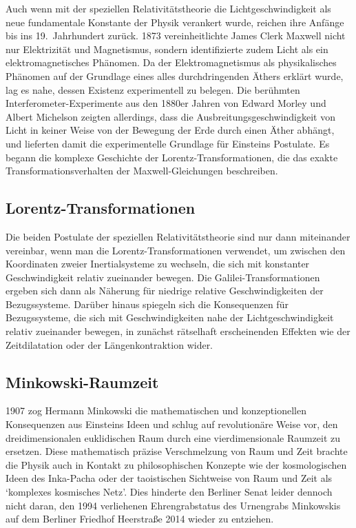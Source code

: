 Auch wenn mit der speziellen Relativitätstheorie die Lichtgeschwindigkeit als neue fundamentale Konstante der Physik verankert wurde, reichen ihre Anfänge bis ins 19.\ Jahrhundert zurück. 1873 vereinheitlichte James Clerk Maxwell nicht nur Elektrizität und Magnetismus, sondern identifizierte zudem Licht als ein elektromagnetisches Phänomen. Da der Elektromagnetismus als physikalisches Phänomen auf der Grundlage eines alles durchdringenden Äthers erklärt wurde, lag es nahe, dessen Existenz experimentell zu belegen. Die berühmten Interferometer-Experimente aus den 1880er Jahren von Edward Morley und Albert Michelson zeigten allerdings, dass die Ausbreitungsgeschwindigkeit von Licht in keiner Weise von der Bewegung der Erde durch einen Äther abhängt, und lieferten damit die experimentelle Grundlage für Einsteins Postulate. Es begann die komplexe Geschichte der Lorentz-Transformationen, die das exakte Transformationsverhalten der Maxwell-Gleichungen beschreiben.


\subsection*{Lorentz-Transformationen}

Die beiden Postulate der speziellen Relativitätstheorie sind nur dann miteinander vereinbar, wenn man die Lorentz-Transformationen verwendet, um zwischen den Koordinaten zweier Inertialsysteme zu wechseln, die sich mit konstanter Geschwindigkeit relativ zueinander bewegen. Die Galilei-Transformationen ergeben sich dann als Näherung für niedrige relative Geschwindigkeiten der Bezugssysteme. Darüber hinaus spiegeln sich die Konsequenzen für Bezugssysteme, die sich mit Geschwindigkeiten nahe der  Lichtgeschwindigkeit relativ zueinander bewegen, in zunächst rätselhaft erscheinenden Effekten wie der Zeitdilatation oder der Längenkontraktion wider.


\subsection*{Minkowski-Raumzeit}

1907 zog Hermann Minkowski die mathematischen und konzeptionellen Konsequenzen aus Einsteins Ideen und schlug auf revolutionäre Weise vor, den dreidimensionalen euklidischen Raum durch eine vierdimensionale Raumzeit zu ersetzen. Diese mathematisch präzise Verschmelzung von Raum und Zeit brachte die Physik auch in Kontakt zu philosophischen Konzepte wie der kosmologischen Ideen des Inka-Pacha oder der taoistischen Sichtweise von Raum und Zeit als \enquote*{komplexes kosmisches Netz}. Dies hinderte den Berliner Senat leider dennoch nicht daran, den 1994 verliehenen Ehrengrabstatus des Urnengrabs Minkowskis auf dem Berliner Friedhof Heerstraße 2014 wieder zu entziehen.

